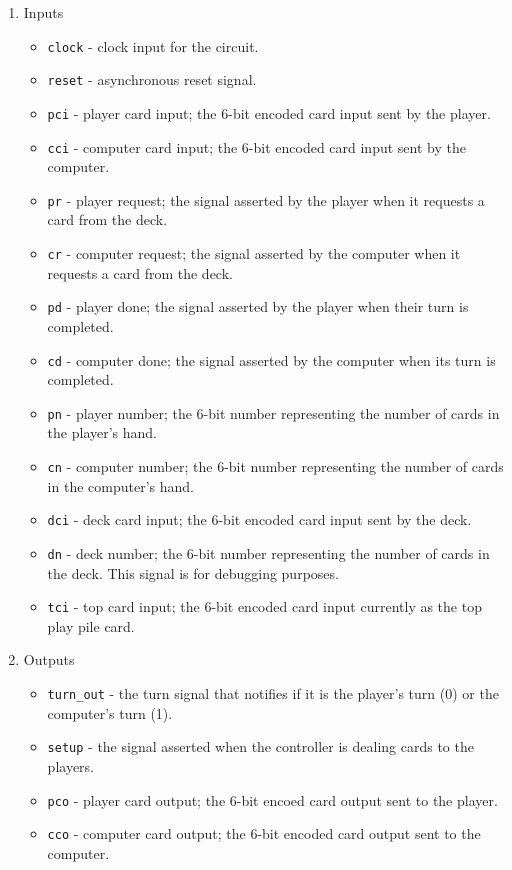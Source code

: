 \documentclass[12pt]{article}
\begin{document}
\begin{enumerate}
\item Inputs
\begin{itemize}
\item \texttt{clock} - clock input for the circuit.
\item \texttt{reset} - asynchronous reset signal.
\item \texttt{pci} - player card input; the 6-bit encoded card input sent by the player.
\item \texttt{cci} - computer card input; the 6-bit encoded card input sent by the computer.
\item \texttt{pr} - player request; the signal asserted by the player when it requests a card from the deck.
\item \texttt{cr} - computer request; the signal asserted by the computer when it requests a card from the deck.
\item \texttt{pd} - player done; the signal asserted by the player when their turn is completed.
\item \texttt{cd} - computer done; the signal asserted by the computer when its turn is completed.
\item \texttt{pn} - player number; the 6-bit number representing the number of cards in the player's hand.
\item \texttt{cn} - computer number; the 6-bit number representing the number of cards in the computer's hand.
\item \texttt{dci} - deck card input; the 6-bit encoded card input sent by the deck.
\item \texttt{dn} - deck number; the 6-bit number representing the number of cards in the deck. This signal is for debugging purposes.
\item \texttt{tci} - top card input; the 6-bit encoded card input currently as the top play pile card.
\end{itemize}
\item Outputs
\begin{itemize}
\item \texttt{turn\_out} - the turn signal that notifies if it is the player's turn (0) or the computer's turn (1).
\item \texttt{setup} - the signal asserted when the controller is dealing cards to the players.
\item \texttt{pco} - player card output; the 6-bit encoed card output sent to the player.
\item \texttt{cco} - computer card output; the 6-bit encoded card output sent to the computer.

\end{itemize}
\end{enumerate}
\end{document}
